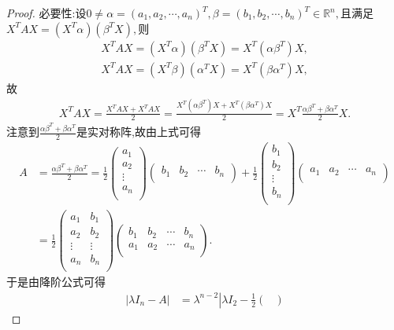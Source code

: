 \documentclass[../../main.tex]{subfiles}%
\begin{document}
\begin{proof}
{\heiti 必要性:}设$0\ne \alpha =( a_1,a_2,\cdots ,a_n ) ^T,\beta =( b_1,b_2,\cdots ,b_n ) ^T\in \mathbb{R} ^n,$且满足$X^TAX=( X^T\alpha ) ( \beta ^TX ),$则
\begin{align*}
X^TAX=( X^T\alpha ) ( \beta ^TX ) =X^T( \alpha \beta ^T ) X,\\
X^TAX=( X^T\beta ) ( \alpha ^TX ) =X^T( \beta \alpha ^T ) X,
\end{align*}
故
\begin{align*}
X^TAX=\frac{X^TAX+X^TAX}{2}=\frac{X^T( \alpha \beta ^T ) X+X^T( \beta \alpha ^T ) X}{2}=X^T\frac{\alpha \beta ^T+\beta \alpha ^T}{2}X.
\end{align*}
注意到$\frac{\alpha \beta ^T+\beta \alpha ^T}{2}$是实对称阵,故由上式可得
\begin{align*}
A&=\frac{\alpha \beta ^T+\beta \alpha ^T}{2}=\frac{1}{2}\begin{pmatrix}
a_1\\
a_2\\
\vdots\\
a_n\\
\end{pmatrix}\begin{pmatrix}
b_1&		b_2&		\cdots&		b_n\\
\end{pmatrix} +\frac{1}{2}\begin{pmatrix}
b_1\\
b_2\\
\vdots\\
b_n\\
\end{pmatrix}\begin{pmatrix}
a_1&		a_2&		\cdots&		a_n\\
\end{pmatrix} 
\\
&=\frac{1}{2}\begin{pmatrix}
a_1&		b_1\\
a_2&		b_2\\
\vdots&		\vdots\\
a_n&		b_n\\
\end{pmatrix}\begin{pmatrix}
b_1&		b_2&		\cdots&		b_n\\
a_1&		a_2&		\cdots&		a_n\\
\end{pmatrix}.
\end{align*}
于是由降阶公式可得
\begin{align*}
| \lambda I_n-A |&=\lambda ^{n-2}\left| \lambda I_2-\frac{1}{2}\begin{pmatrix}

\end{pmatrix}
\end{align*}
\end{proof}
\end{document}

